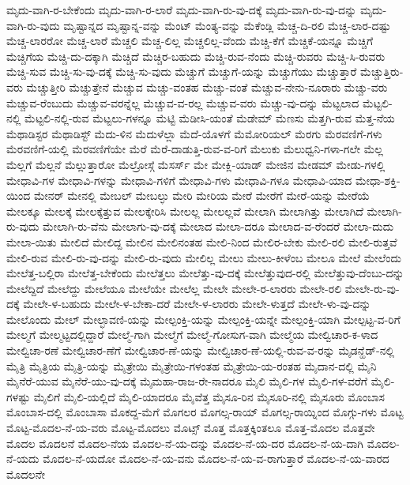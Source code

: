 {ಮೃದು-ವಾಗಿ-ರ-ಬೇಕೆಂದು
ಮೃದು-ವಾಗಿ-ರ-ಲಾರೆ
ಮೃದು-ವಾಗಿ-ರು-ವು-ದಕ್ಕೆ
ಮೃದು-ವಾಗಿ-ರು-ವು-ದನ್ನು
ಮೃದು-ವಾಗಿ-ರು-ವುದು
ಮೃಷ್ಟಾನ್ನದ
ಮೃಷ್ಟಾನ್ನ-ವನ್ನು
ಮೆಂಟ್
ಮೆಂತ್ಯ-ವನ್ನು
ಮೆಕೆಂಡ್ಲಿ
ಮೆಚ್ಚ-ದಿ-ರಲಿ
ಮೆಚ್ಚ-ಲಾರ-ದಷ್ಟು
ಮೆಚ್ಚ-ಲಾರರೋ
ಮೆಚ್ಚ-ಲಾರೆ
ಮೆಚ್ಚಲಿ
ಮೆಚ್ಚ-ಲಿಲ್ಲ
ಮೆಚ್ಚಲಿಲ್ಲ-ವೆಂದು
ಮೆಚ್ಚಿ-ಕೆಗೆ
ಮೆಚ್ಚಿಕೆ-ಯನ್ನೂ
ಮೆಚ್ಚಿಗೆ
ಮೆಚ್ಚಿಗೆಯ
ಮೆಚ್ಚಿ-ದು-ದಕ್ಕಾಗಿ
ಮೆಚ್ಚಿದೆ
ಮೆಚ್ಚಿರ-ಬಹುದು
ಮೆಚ್ಚಿ-ರುವ-ನೆಂದು
ಮೆಚ್ಚಿ-ರುವರು
ಮೆಚ್ಚಿ-ಸಿ-ರುವರು
ಮೆಚ್ಚಿ-ಸುವ
ಮೆಚ್ಚಿ-ಸು-ವು-ದಕ್ಕೆ
ಮೆಚ್ಚಿ-ಸು-ವುದು
ಮೆಚ್ಚುಗೆ
ಮೆಚ್ಚುಗೆ-ಯನ್ನು
ಮೆಚ್ಚುಗೆಯು
ಮೆಚ್ಚುತ್ತಾರೆ
ಮೆಚ್ಚುತ್ತಿರು-ವರು
ಮೆಚ್ಚುತ್ತೀರಿ
ಮೆಚ್ಚುತ್ತೇನೆ
ಮೆಚ್ಚುವ
ಮೆಚ್ಚು-ವಂತಹ
ಮೆಚ್ಚು-ವಂತೆ
ಮೆಚ್ಚುವ-ನೇನು-ನೂರಾರು
ಮೆಚ್ಚು-ವರು
ಮೆಚ್ಚುವ-ರೆಂಬುದು
ಮೆಚ್ಚುವ-ವರನ್ನೆಲ್ಲ
ಮೆಚ್ಚುವ-ವ-ರಲ್ಲ
ಮೆಚ್ಚುವ-ವರು
ಮೆಚ್ಚು-ವು-ದನ್ನು
ಮೆಟ್ಟಲಾದ
ಮೆಟ್ಟಲಿ-ನಲ್ಲಿ
ಮೆಟ್ಟಲಿ-ನಲ್ಲಿ-ರುವ
ಮೆಟ್ಟಲು-ಗಳನ್ನೂ
ಮೆಟ್ಟಿ
ಮೆಡೀಸಿ-ಯಂತೆ
ಮೆಡೇಮ್
ಮೆಣಸು
ಮೆತ್ತಗಿ-ರುವ
ಮೆತ್ತ-ನೆಯ
ಮೆಥಾಡಿಸ್ಟರ
ಮೆಥಾಡಿಸ್ಟ್
ಮೆದು-ಳಿನ
ಮೆದುಳೆಲ್ಲಾ
ಮೆದೆ-ಯೊಳಗೆ
ಮೆಮೋರಿಯಲ್
ಮೆರಗು
ಮೆರವಣಿಗೆ-ಗಳು
ಮೆರವಣಿಗೆ-ಯಲ್ಲಿ
ಮೆರವಣಿಗೆಯೇ
ಮೆರೆ
ಮೆರೆ-ದಾಡುತ್ತಿ-ರುವ-ವ-ರಿಗೆ
ಮೆಲುಕು
ಮೆಲುಧ್ವನಿ-ಗಳಾ-ಗಲೇ
ಮೆಲ್ಲ
ಮೆಲ್ಲಗೆ
ಮೆಲ್ಲನೆ
ಮೆಲ್ಲುತ್ತಾರೋ
ಮೆಲ್ರೋಸ್ಗೆ
ಮೆಸರ್ಸ್
ಮೇ
ಮೇಕ್ಲಿ-ಯಾಡ್
ಮೇಜಿನ
ಮೇಡಮ್
ಮೇಡು-ಗಳಲ್ಲಿ
ಮೇಧಾವಿ-ಗಳ
ಮೇಧಾವಿ-ಗಳನ್ನು
ಮೇಧಾವಿ-ಗಳಿಗೆ
ಮೇಧಾವಿ-ಗಳು
ಮೇಧಾವಿ-ಗಳೂ
ಮೇಧಾವಿ-ಯಾದ
ಮೇಧಾ-ಶಕ್ತಿ-ಯಿಂದ
ಮೇನರ್
ಮೇನಲ್ಲಿ
ಮೇಬಲ್
ಮೇಬಲ್ಳು
ಮೇರಿ
ಮೇರಿಯ
ಮೇರೆ
ಮೇರೆಗೆ
ಮೇರೆ-ಯನ್ನು
ಮೇರೆಯೆ
ಮೇಲಕ್ಕೂ
ಮೇಲಕ್ಕೆ
ಮೇಲಕ್ಕೆತ್ತುವ
ಮೇಲಕ್ಕೇರಿಸಿ
ಮೇಲಲ್ಲ
ಮೇಲಲ್ಲವೆ
ಮೇಲಾಗಿ
ಮೇಲಾಗಿತ್ತು
ಮೇಲಾಗಿದೆ
ಮೇಲಾಗಿ-ರು-ವುದು
ಮೇಲಾಗಿ-ರು-ವೆನು
ಮೇಲಾಗು-ವು-ದಕ್ಕೆ
ಮೇಲಾದ
ಮೇಲಾ-ದರೂ
ಮೇಲಾದ-ವ-ರೆಂದರೆ
ಮೇಲಾ-ದುದು
ಮೇಲಾ-ಯಿತು
ಮೇಲಿದೆ
ಮೇಲಿದ್ದ
ಮೇಲಿನ
ಮೇಲಿನಂತಹ
ಮೇಲಿ-ನಿಂದ
ಮೇಲಿರ-ಬೇಕು
ಮೇಲಿ-ರಲಿ
ಮೇಲಿ-ರುತ್ತವೆ
ಮೇಲಿ-ರುವ
ಮೇಲಿ-ರು-ವು-ದನ್ನು
ಮೇಲಿ-ರು-ವುದು
ಮೇಲಿಲ್ಲ
ಮೇಲು
ಮೇಲು-ಕೀಳೆಂಬ
ಮೇಲೂ
ಮೇಲೆ
ಮೇಲೆಂದು
ಮೇಲೆತ್ತ-ಬಲ್ಲಿರಾ
ಮೇಲೆತ್ತ-ಬೇಕೆಂದು
ಮೇಲೆತ್ತಲು
ಮೇಲೆತ್ತು-ವು-ದಕ್ಕೆ
ಮೇಲೆತ್ತುವುದ-ರಲ್ಲಿ
ಮೇಲೆತ್ತುವು-ದೆಂಬು-ದನ್ನು
ಮೇಲೆದ್ದಿದೆ
ಮೇಲೆದ್ದು
ಮೇಲೆಯೂ
ಮೇಲೆಯೇ
ಮೇಲೆಲ್ಲ
ಮೇಲೇ
ಮೇಲೇ-ರ-ಲಾರರು
ಮೇಲೇ-ರಲಿ
ಮೇಲೇ-ರು-ವು-ದಕ್ಕೆ
ಮೇಲೇ-ಳ-ಬಹುದು
ಮೇಲೇ-ಳ-ಬೇಕಾ-ದರೆ
ಮೇಲೇ-ಳ-ಲಾರರು
ಮೇಲೇ-ಳುತ್ತದೆ
ಮೇಲೇ-ಳು-ವು-ದನ್ನು
ಮೇಲೊಂದು
ಮೇಲ್
ಮೇಲ್ಛಾವಣಿ-ಯನ್ನು
ಮೇಲ್ಪಂಕ್ತಿ-ಯನ್ನು
ಮೇಲ್ಪಂಕ್ತಿ-ಯನ್ನೇ
ಮೇಲ್ಪಂಕ್ತಿ-ಯಾಗಿ
ಮೇಲ್ಪಟ್ಟ-ವ-ರಿಗೆ
ಮೇಲ್ಮಗೆ
ಮೇಲ್ಮಟ್ಟದಲ್ಲಿದ್ದಾರೆ
ಮೇಲ್ಮೆ-ಗಾಗಿ
ಮೇಲ್ಮೆಗೆ
ಮೇಲ್ಮೆ-ಗೋಸುಗ-ವಾಗಿ
ಮೇಲ್ಮೆಯ
ಮೇಲ್ವಿಚಾರ-ಕ-ಳಾದ
ಮೇಲ್ವಿಚಾ-ರಣೆ
ಮೇಲ್ವಿಚಾರ-ಣೆಗೆ
ಮೇಲ್ವಿಚಾರ-ಣೆ-ಯನ್ನು
ಮೇಲ್ವಿಚಾರ-ಣೆ-ಯಲ್ಲಿ-ರುವ-ವ-ರನ್ನು
ಮೈಡನ್ಹೆಡ್-ನಲ್ಲಿ
ಮೈತ್ರಿ
ಮೈತ್ರಿಯ
ಮೈತ್ರಿ-ಯನ್ನು
ಮೈತ್ರೇಯಿ
ಮೈತ್ರೇಯಿ-ಗಳಂತಹ
ಮೈತ್ರೇಯಿ-ಯ-ರಂತಹ
ಮೈದಾನ-ದಲ್ಲಿ
ಮೈನಿ
ಮೈನೆರೆ-ಯುವ
ಮೈನೆರೆ-ಯು-ವು-ದಕ್ಕೆ
ಮೈಮಹಾ-ರಾಜ-ರೇ-ನಾದರೂ
ಮೈಲಿ
ಮೈಲಿ-ಗಳ
ಮೈಲಿ-ಗಳ-ವರೆಗೆ
ಮೈಲಿ-ಗಳಷ್ಟು
ಮೈಲಿಗೆ
ಮೈಲಿ-ಯಲ್ಲಿದೆ
ಮೈಲಿ-ಯಾದರೂ
ಮೈವೆತ್ತ
ಮೈಸೂ-ರಿನ
ಮೈಸೂರಿ-ನಲ್ಲಿ
ಮೈಸೂರು
ಮೊಂಬಾಸ
ಮೊಂಬಾಸ-ದಲ್ಲಿ
ಮೊಂಬಾಸಾ
ಮೊಕದ್ದ-ಮೆಗೆ
ಮೊಗಲರ
ಮೊಗಲ್ಸ-ರಾಯ್
ಮೊಗಲ್ಸ-ರಾಯ್ನಿಂದ
ಮೊಗ್ಗು-ಗಳು
ಮೊಟ್ಟ
ಮೊಟ್ಟ-ಮೊದಲ-ನೆ-ಯ-ವರು
ಮೊಟ್ಟ-ಮೊದಲು
ಮೊಟ್ಸ್
ಮೊತ್ತ
ಮೊತ್ತಕ್ಕಿಂತಲೂ
ಮೊತ್ತ-ಮೊದಲ
ಮೊತ್ತವೇ
ಮೊದಲ
ಮೊದಲನೆ
ಮೊದಲ-ನೆಯ
ಮೊದಲ-ನೆ-ಯ-ದನ್ನು
ಮೊದಲ-ನೆ-ಯ-ದರ
ಮೊದಲ-ನೆ-ಯ-ದಾಗಿ
ಮೊದಲ-ನೆ-ಯದು
ಮೊದಲ-ನೆ-ಯದೋ
ಮೊದಲ-ನೆ-ಯ-ವನು
ಮೊದಲ-ನೆ-ಯ-ವ-ರಾಗುತ್ತಾರೆ
ಮೊದಲ-ನೆ-ಯ-ವಾರದ
ಮೊದಲನೇ
}
